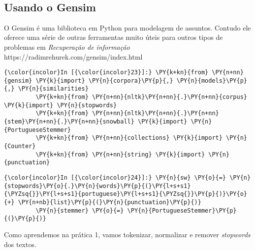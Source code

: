     \begin{center}
    \end{center}
    { \hspace*{\fill} \\}
    
    \subsection{Usando o Gensim}\label{usando-o-gensim}

O Gensim é uma biblioteca em Python para modelagem de assuntos. Contudo
ele oferece uma série de outras ferramentas muito úteis para outros
tipos de problemas em \emph{Recuperação de informação}
https://radimrehurek.com/gensim/index.html

    \begin{Verbatim}[commandchars=\\\{\}]
{\color{incolor}In [{\color{incolor}23}]:} \PY{k+kn}{from} \PY{n+nn}{gensim} \PY{k}{import} \PY{n}{corpora}\PY{p}{,} \PY{n}{models}\PY{p}{,} \PY{n}{similarities}
         \PY{k+kn}{from} \PY{n+nn}{nltk}\PY{n+nn}{.}\PY{n+nn}{corpus} \PY{k}{import} \PY{n}{stopwords}
         \PY{k+kn}{from} \PY{n+nn}{nltk}\PY{n+nn}{.}\PY{n+nn}{stem}\PY{n+nn}{.}\PY{n+nn}{snowball} \PY{k}{import} \PY{n}{PortugueseStemmer}
         \PY{k+kn}{from} \PY{n+nn}{collections} \PY{k}{import} \PY{n}{Counter}
         \PY{k+kn}{from} \PY{n+nn}{string} \PY{k}{import} \PY{n}{punctuation}
\end{Verbatim}

    \begin{Verbatim}[commandchars=\\\{\}]
{\color{incolor}In [{\color{incolor}24}]:} \PY{n}{sw} \PY{o}{=} \PY{n}{stopwords}\PY{o}{.}\PY{n}{words}\PY{p}{(}\PY{l+s+s1}{\PYZsq{}}\PY{l+s+s1}{portuguese}\PY{l+s+s1}{\PYZsq{}}\PY{p}{)}\PY{o}{+} \PY{n+nb}{list}\PY{p}{(}\PY{n}{punctuation}\PY{p}{)}
         \PY{n}{stemmer} \PY{o}{=} \PY{n}{PortugueseStemmer}\PY{p}{(}\PY{p}{)}
\end{Verbatim}

    Como aprendemos na prática 1, vamos tokenizar, normalizar e remover
\emph{stopwords} dos textos.

